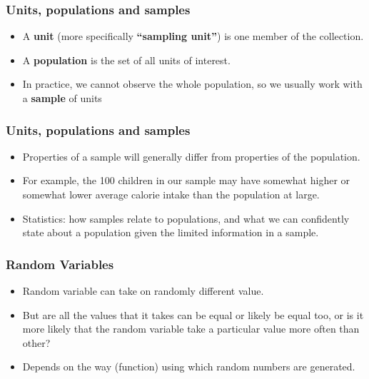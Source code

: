 \begin{frame}
\frametitle{Units, populations and samples}

\begin{itemize}
\item A {\bf unit} (more specifically {\bf ``sampling unit''}) is one member
of the collection.
\item A {\bf population} is the set of all units of interest. 
\item In practice, we cannot observe the whole population, so we usually
work with a {\bf sample} of units
\end{itemize}
\end{frame}

\begin{frame}
\frametitle{Units, populations and samples}


\begin{itemize}
\item Properties of a sample will generally differ from properties of the
population.  
\item For example, the 100 children in our sample may have
somewhat higher or somewhat lower average calorie intake than the
population at large. 
\item 
Statistics: how samples relate to
populations, and what we can confidently state about a population
given the limited information in a sample.

\end{itemize}

\end{frame}

\begin{frame}\frametitle{Random Variables}
\begin{itemize}
\item  Random variable can take on randomly different
value. 
\item But are all the values that it takes can be equal or likely be equal
too, or is it more likely that the random variable take a particular value
more often than other?
\item Depends on the way (function) using which random numbers are generated.
\end{itemize}
\end{frame}

